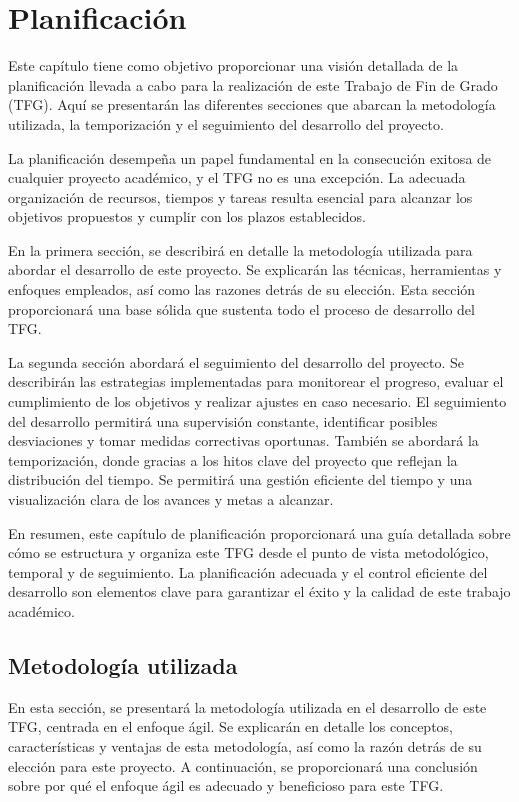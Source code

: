 \chapter{Planificación}

Este capítulo tiene como objetivo proporcionar una visión detallada de la planificación llevada a cabo para la realización de este Trabajo de Fin de Grado (TFG). Aquí se presentarán las diferentes secciones que abarcan la metodología utilizada, la temporización y el seguimiento del desarrollo del proyecto.

La planificación desempeña un papel fundamental en la consecución exitosa de cualquier proyecto académico, y el TFG no es una excepción. La adecuada organización de recursos, tiempos y tareas resulta esencial para alcanzar los objetivos propuestos y cumplir con los plazos establecidos.

En la primera sección, se describirá en detalle la metodología utilizada para abordar el desarrollo de este proyecto. Se explicarán las técnicas, herramientas y enfoques empleados, así como las razones detrás de su elección. Esta sección proporcionará una base sólida que sustenta todo el proceso de desarrollo del TFG.

La segunda sección abordará el seguimiento del desarrollo del proyecto. Se describirán las estrategias implementadas para monitorear el progreso, evaluar el cumplimiento de los objetivos y realizar ajustes en caso necesario. El seguimiento del desarrollo permitirá una supervisión constante, identificar posibles desviaciones y tomar medidas correctivas oportunas. También se abordará la temporización, donde gracias a los hitos clave del proyecto que reflejan la distribución del tiempo. Se permitirá una gestión eficiente del tiempo y una visualización clara de los avances y metas a alcanzar.

En resumen, este capítulo de planificación proporcionará una guía detallada sobre cómo se estructura y organiza este TFG desde el punto de vista metodológico, temporal y de seguimiento. La planificación adecuada y el control eficiente del desarrollo son elementos clave para garantizar el éxito y la calidad de este trabajo académico.

\section{Metodología utilizada}

En esta sección, se presentará la metodología utilizada en el desarrollo de este TFG, centrada en el enfoque ágil. Se explicarán en detalle los conceptos, características y ventajas de esta metodología, así como la razón detrás de su elección para este proyecto. A continuación, se proporcionará una conclusión sobre por qué el enfoque ágil es adecuado y beneficioso para este TFG.

